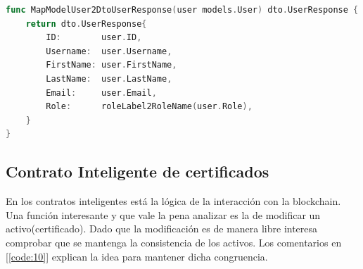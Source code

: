 \begin{lstlisting}[language=Go,caption={Mapper de modelo de usuario a dto de usuarios para mostrar al cliente}, label={code:9}]
func MapModelUser2DtoUserResponse(user models.User) dto.UserResponse {
	return dto.UserResponse{
		ID:        user.ID,
		Username:  user.Username,
		FirstName: user.FirstName,
		LastName:  user.LastName,
		Email:     user.Email,
		Role:      roleLabel2RoleName(user.Role),
	}
}
\end{lstlisting}

\subsection{Contrato Inteligente de certificados}
En los contratos inteligentes está la lógica de la interacción con la blockchain. Una función interesante y que vale la pena analizar es la de modificar un activo(certificado). Dado que la modificación es de manera libre interesa comprobar que se mantenga la consistencia de los activos. Los comentarios en [\ref{code:10}] explican la idea para mantener dicha congruencia.

